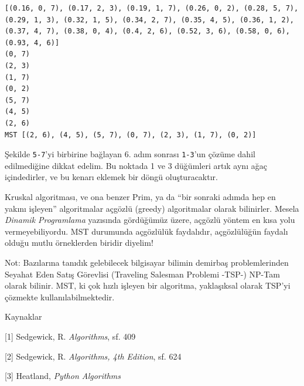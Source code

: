 \documentclass[12pt,fleqn]{article}\usepackage{../../common}
\begin{document}
\begin{verbatim}
[(0.16, 0, 7), (0.17, 2, 3), (0.19, 1, 7), (0.26, 0, 2), (0.28, 5, 7), (0.29, 1, 3), (0.32, 1, 5), (0.34, 2, 7), (0.35, 4, 5), (0.36, 1, 2), (0.37, 4, 7), (0.38, 0, 4), (0.4, 2, 6), (0.52, 3, 6), (0.58, 0, 6), (0.93, 4, 6)]
(0, 7)
(2, 3)
(1, 7)
(0, 2)
(5, 7)
(4, 5)
(2, 6)
MST [(2, 6), (4, 5), (5, 7), (0, 7), (2, 3), (1, 7), (0, 2)]
\end{verbatim}

Şekilde \verb!5-7!'yi birbirine bağlayan 6. adım sonrası \verb!1-3!'un
çözüme dahil edilmediğine dikkat edelim. Bu noktada 1 ve 3 düğümleri artık
aynı ağaç içindedirler, ve bu kenarı eklemek bir döngü oluşturacaktır. 

Kruskal algoritması, ve ona benzer Prim, ya da ``bir sonraki adımda hep en
yakını işleyen'' algoritmalar açgözlü (greedy) algoritmalar olarak
bilinirler. Mesela {\em Dinamik Programlama} yazısında gördüğümüz üzere,
açgözlü yöntem en kısa yolu vermeyebiliyordu. MST durumunda açgözlülük
faydalıdır, açgözlülüğün faydalı olduğu mutlu örneklerden biridir diyelim! 

Not: Bazılarına tanıdık gelebilecek bilgisayar bilimin demirbaş
problemlerinden Seyahat Eden Satış Görevlisi (Traveling Salesman Problemi
-TSP-) NP-Tam olarak bilinir. MST, ki çok hızlı işleyen bir algoritma,
yaklaşıksal olarak TSP'yi çözmekte kullanılabilmektedir. 

Kaynaklar

[1] Sedgewick, R. {\em Algorithms}, sf. 409

[2] Sedgewick, R. {\em Algorithms, 4th Edition}, sf. 624

[3] Heatland, {\em Python Algorithms}
\end{document}
